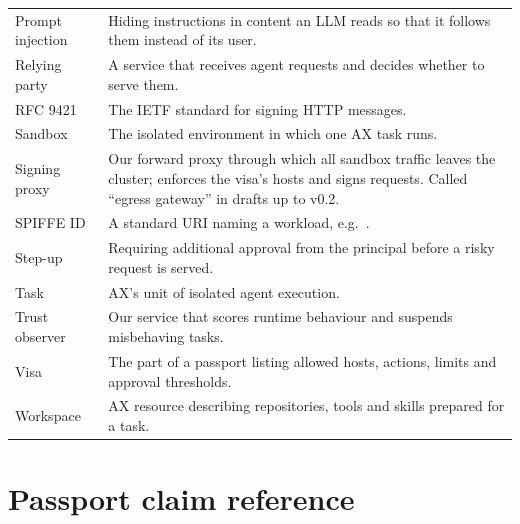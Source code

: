 \begin{center}
\begin{longtable}{@{}L{3.8cm}L{12.3cm}@{}}
Prompt injection & Hiding instructions in content an LLM reads so that it follows them instead of its user.\\
Relying party & A service that receives agent requests and decides whether to serve them.\\
RFC 9421 & The IETF standard for signing HTTP messages.\\
Sandbox & The isolated environment in which one AX task runs.\\
Signing proxy & Our forward proxy through which all sandbox traffic leaves the cluster; enforces the visa's hosts and signs requests. Called ``egress gateway'' in drafts up to v0.2.\\
SPIFFE ID & A standard URI naming a workload, e.g.\ .\\
Step-up & Requiring additional approval from the principal before a risky request is served.\\
Task & AX's unit of isolated agent execution.\\
Trust observer & Our service that scores runtime behaviour and suspends misbehaving tasks.\\
Visa & The part of a passport listing allowed hosts, actions, limits and approval thresholds.\\
Workspace & AX resource describing repositories, tools and skills prepared for a task.\\
\bottomrule
\end{longtable}
\end{center}

\section{Passport claim reference}

